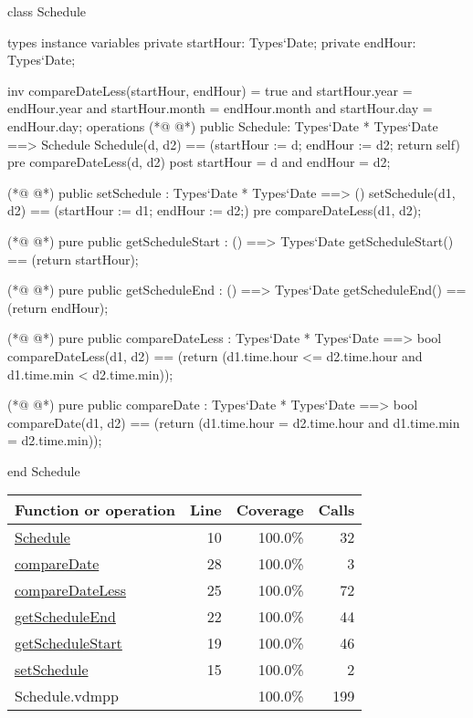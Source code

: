 \begin{vdmpp}[breaklines=true]
class Schedule

types
instance variables
  private startHour: Types`Date;
  private endHour: Types`Date;
  
  inv compareDateLess(startHour, endHour) = true and startHour.year = endHour.year and startHour.month = endHour.month and startHour.day = endHour.day;
operations 
(*@
\label{Schedule:10}
@*)
 public Schedule: Types`Date * Types`Date ==> Schedule
  Schedule(d, d2) == (startHour := d; endHour := d2; return self)
 pre compareDateLess(d, d2)
 post startHour = d and endHour = d2;
 
(*@
\label{setSchedule:15}
@*)
 public setSchedule : Types`Date * Types`Date ==> ()
  setSchedule(d1, d2) == (startHour := d1; endHour := d2;)
 pre compareDateLess(d1, d2);
  
(*@
\label{getScheduleStart:19}
@*)
 pure public getScheduleStart : () ==> Types`Date
  getScheduleStart() == (return startHour);
  
(*@
\label{getScheduleEnd:22}
@*)
 pure public getScheduleEnd : () ==> Types`Date
  getScheduleEnd() == (return endHour);
  
(*@
\label{compareDateLess:25}
@*)
 pure public compareDateLess : Types`Date * Types`Date ==> bool
  compareDateLess(d1, d2) == (return (d1.time.hour <= d2.time.hour and d1.time.min < d2.time.min));
  
(*@
\label{compareDate:28}
@*)
 pure public compareDate : Types`Date * Types`Date ==> bool
  compareDate(d1, d2) == (return (d1.time.hour = d2.time.hour and d1.time.min = d2.time.min));

end Schedule
\end{vdmpp}
\bigskip
\begin{longtable}{|l|r|r|r|}
\hline
Function or operation & Line & Coverage & Calls \\
\hline
\hline
\hyperref[Schedule:10]{Schedule} & 10&100.0\% & 32 \\
\hline
\hyperref[compareDate:28]{compareDate} & 28&100.0\% & 3 \\
\hline
\hyperref[compareDateLess:25]{compareDateLess} & 25&100.0\% & 72 \\
\hline
\hyperref[getScheduleEnd:22]{getScheduleEnd} & 22&100.0\% & 44 \\
\hline
\hyperref[getScheduleStart:19]{getScheduleStart} & 19&100.0\% & 46 \\
\hline
\hyperref[setSchedule:15]{setSchedule} & 15&100.0\% & 2 \\
\hline
\hline
Schedule.vdmpp & & 100.0\% & 199 \\
\hline
\end{longtable}

